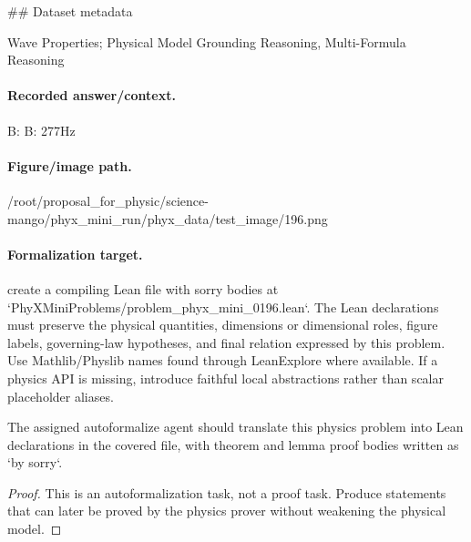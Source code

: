 \#\# Dataset metadata

Wave Properties; Physical Model Grounding Reasoning, Multi-Formula Reasoning

\paragraph{Recorded answer/context.}
B: B: 277Hz

\paragraph{Figure/image path.}
/root/proposal\_for\_physic/science-mango/phyx\_mini\_run/phyx\_data/test\_image/196.png

\paragraph{Formalization target.}
create a compiling Lean file with sorry bodies at `PhyXMiniProblems/problem\_phyx\_mini\_0196.lean`. The Lean declarations must preserve the physical quantities, dimensions or dimensional roles, figure labels, governing-law hypotheses, and final relation expressed by this problem.
Use Mathlib/Physlib names found through LeanExplore where available. If a physics API is missing, introduce faithful local abstractions rather than scalar placeholder aliases.

\begin{theorem}
\label{thm:physics:phyx_mini_0196:target}
The assigned autoformalize agent should translate this physics problem into Lean declarations in the covered file, with theorem and lemma proof bodies written as `by sorry`.
\end{theorem}
\begin{proof}
This is an autoformalization task, not a proof task. Produce statements that can later be proved by the physics prover without weakening the physical model.
\end{proof}

